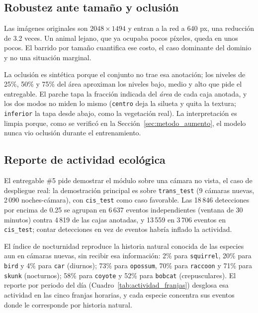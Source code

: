 \subsection{Robustez ante tamaño y oclusión}
\label{sec:robustez}



Las imágenes originales son $2048\times1494$ y entran a la red a 640 px, una
reducción de 3.2 veces. Un animal lejano, que ya ocupaba pocos píxeles, queda en
unos pocos. El barrido por tamaño cuantifica ese costo, el caso dominante del
dominio y no una situación marginal.

La oclusión es sintética porque el conjunto no trae esa anotación; los niveles
de 25\%, 50\% y 75\% del área aproximan los niveles bajo, medio y alto que pide
el entregable. El parche tapa la fracción indicada
del \emph{área} de cada caja anotada, y los dos modos no miden lo mismo
(\texttt{centro} deja la silueta y quita la textura; \texttt{inferior} la tapa
desde abajo, como la vegetación real). La interpretación es limpia porque, como
se verificó en la Sección~\ref{sec:metodo_aumento}, el modelo nunca vio oclusión
durante el entrenamiento.

\subsection{Reporte de actividad ecológica}

El entregable \#5 pide demostrar el módulo sobre una cámara no vista, el caso de
despliegue real: la demostración principal es sobre \texttt{trans\_test} (9
cámaras nuevas, 2\,090 noches-cámara), con \texttt{cis\_test} como caso
favorable. Las 18\,846 detecciones por encima de 0.25 se agrupan en 6\,637
eventos independientes (ventana de 30 minutos) contra 4\,819 de las cajas
anotadas, y 13\,559 en 3\,706 eventos en \texttt{cis\_test}; contar detecciones
en vez de eventos habría inflado la actividad.



El índice de nocturnidad reproduce la historia natural conocida de las especies
aun en cámaras nuevas, sin recibir esa información: 2\% para \texttt{squirrel},
20\% para \texttt{bird} y 4\% para \texttt{car} (diurnos); 73\% para
\texttt{opossum}, 70\% para \texttt{raccoon} y 71\% para \texttt{skunk}
(nocturnos); 58\% para \texttt{coyote} y 52\% para \texttt{bobcat}
(crepusculares). El reporte por periodo del día
(Cuadro~\ref{tab:actividad_franjas}) desglosa esa actividad en las cinco franjas
horarias, y cada especie concentra sus eventos donde le corresponde por historia
natural.

